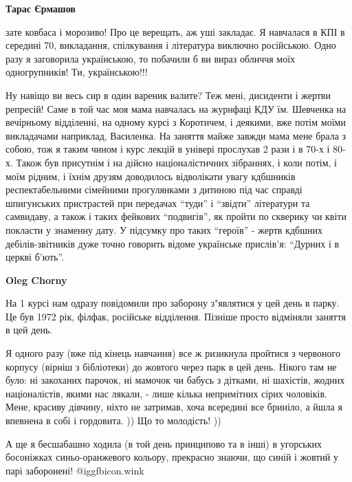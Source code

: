 \begin{itemize}
\begin{itemize}
\begin{itemize}
\textbf{Тарас Єрмашов} 

зате ковбаса і морозиво! Про це верещать, аж уші закладає. Я навчалася в КПІ в
середині 70, викладання, спілкування і література виключно російською. Одно
разу я заговорила українською, то побачили б ви вираз обличчя моїх
одногрупників! Ти, українською!!!


Ну навіщо ви весь сир в один вареник валите? Теж мені, дисиденти і жертви
репресій! Саме в той час моя мама навчалась на журнфаці КДУ їм. Шевченка на
вечірньому відділенні, на одному курсі з Коротичем, і деякими, вже потім моїми
викладачами наприклад, Василенка. На заняття майже завжди мама мене брала з
собою, тож я таким чином і курс лекцій в універі прослухав 2 рази і в 70-х і
80-х. Також був присутнім і на дійсно націоналістичних зібраннях, і коли потім,
і моїм рідним, і їхнім друзям доводилось відволікати увагу кдбшників
респектабельними сімейними прогулянками з дитиною під час справді шпигунських
пристрастей при передачах \enquote{туди} і \enquote{звідти} літератури та
самвидаву, а також і таких фейкових \enquote{подвигів}, як пройти по скверику
чи квіти покласти у знаменну дату. У підсумку про таких \enquote{героїв} -
жертв кдбшних дебілів-звітників дуже точно говорить відоме українське
прислів'я: \enquote{Дурних і в церкві б'ють}.


\textbf{Oleg Chorny} 

На 1 курсі нам одразу повідомили про заборону з"являтися у цей день в парку. Це
був 1972 рік, філфак, російське відділення. Пізніше просто відміняли заняття в
цей день.

Я одного разу (вже під кінець навчання) все ж ризикнула пройтися з червоного
корпусу (вірніш з бібліотеки) до жовтого через парк в цей день. Нікого там не
було: ні закоханих парочок, ні мамочок чи бабусь з дітками, ні шахістів, жодних
націоналістів, якими нас лякали, - лише кілька непримітних сірих чоловіків.
Мене, красиву дівчину, ніхто не затримав, хоча всередині все бриніло, а йшла я
впевнена в собі і гордовита. )) Що то молодість! ))

А ще я бесшабашно ходила (в той день принципово та в інші) в угорських
босоніжках синьо-оранжевого кольору, прекрасно знаючи, що синій і жовтий у парі
заборонені!  @igg{fbicon.wink} 

\end{itemize} %

\end{itemize} %


\end{itemize}

